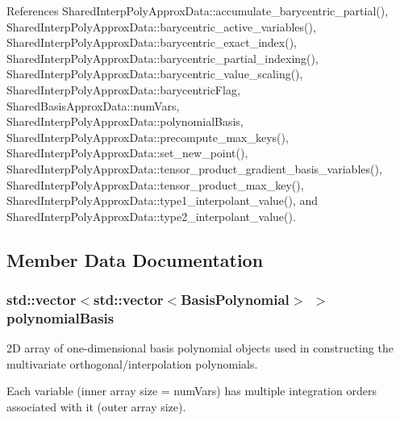 References Shared\+Interp\+Poly\+Approx\+Data\+::accumulate\+\_\+barycentric\+\_\+partial(), Shared\+Interp\+Poly\+Approx\+Data\+::barycentric\+\_\+active\+\_\+variables(), Shared\+Interp\+Poly\+Approx\+Data\+::barycentric\+\_\+exact\+\_\+index(), Shared\+Interp\+Poly\+Approx\+Data\+::barycentric\+\_\+partial\+\_\+indexing(), Shared\+Interp\+Poly\+Approx\+Data\+::barycentric\+\_\+value\+\_\+scaling(), Shared\+Interp\+Poly\+Approx\+Data\+::barycentric\+Flag, Shared\+Basis\+Approx\+Data\+::num\+Vars, Shared\+Interp\+Poly\+Approx\+Data\+::polynomial\+Basis, Shared\+Interp\+Poly\+Approx\+Data\+::precompute\+\_\+max\+\_\+keys(), Shared\+Interp\+Poly\+Approx\+Data\+::set\+\_\+new\+\_\+point(), Shared\+Interp\+Poly\+Approx\+Data\+::tensor\+\_\+product\+\_\+gradient\+\_\+basis\+\_\+variables(), Shared\+Interp\+Poly\+Approx\+Data\+::tensor\+\_\+product\+\_\+max\+\_\+key(), Shared\+Interp\+Poly\+Approx\+Data\+::type1\+\_\+interpolant\+\_\+value(), and Shared\+Interp\+Poly\+Approx\+Data\+::type2\+\_\+interpolant\+\_\+value().



\subsection{Member Data Documentation}
\subsubsection[{\texorpdfstring{polynomial\+Basis}{polynomialBasis}}]{\setlength{\rightskip}{0pt plus 5cm}std\+::vector$<$std\+::vector$<${\bf Basis\+Polynomial}$>$ $>$ polynomial\+Basis\hspace{0.3cm}{\ttfamily [protected]}}\label{classPecos_1_1SharedInterpPolyApproxData_a86109b71b063d95880c10f0290f9a723}


2D array of one-\/dimensional basis polynomial objects used in constructing the multivariate orthogonal/interpolation polynomials. 

Each variable (inner array size = num\+Vars) has multiple integration orders associated with it (outer array size). 

